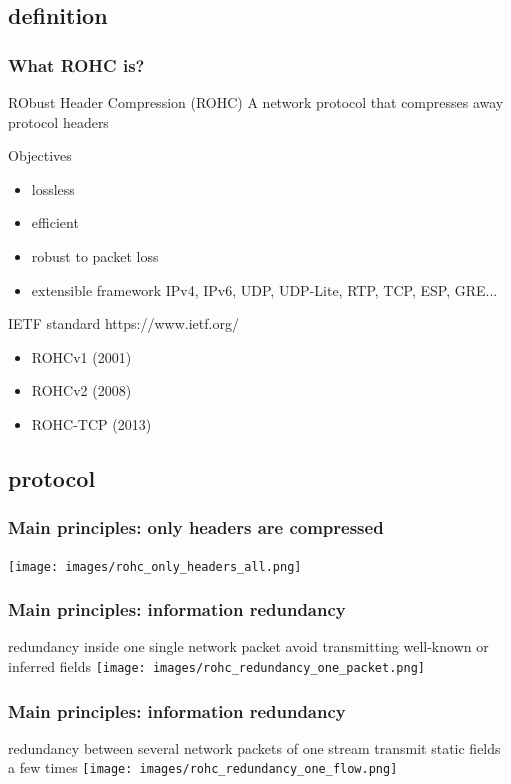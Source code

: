 \documentclass[utf8]{beamer}
\begin{document}
\subsection{definition}
\begin{frame}
	\frametitle{What ROHC is?}
	\begin{block}{RObust Header Compression (ROHC)}
		A network protocol that compresses away protocol headers
	\end{block}
	\pause
	\begin{block}{Objectives}
		\begin{itemize}
			\item lossless
			\item efficient
			\item robust to packet loss
			\item extensible framework {\tiny IPv4, IPv6, UDP, UDP-Lite, RTP, TCP, ESP, GRE...}
		\end{itemize}
	\end{block}
	\pause
	\begin{block}{IETF standard \tiny{https://www.ietf.org/}}
		\begin{itemize}
			\item \small{ROHCv1 (2001)}
			\item \small{ROHCv2 (2008)}
			\item \small{ROHC-TCP (2013)}
		\end{itemize}
	\end{block}
\end{frame}

\subsection{protocol}
\begin{frame}
	\frametitle{Main principles: only headers are compressed}
	\texttt{[image: images/rohc\_only\_headers\_all.png]}
\end{frame}

\begin{frame}
	\frametitle{Main principles: information redundancy}
	\begin{block}{redundancy inside one single network packet}
		avoid transmitting well-known or inferred fields
		\texttt{[image: images/rohc\_redundancy\_one\_packet.png]}
	\end{block}
\end{frame}

\begin{frame}
	\frametitle{Main principles: information redundancy}
	\begin{block}{redundancy between several network packets of one stream}
		transmit static fields a few times
		\texttt{[image: images/rohc\_redundancy\_one\_flow.png]}
	\end{block}
\end{frame}
\end{document}
